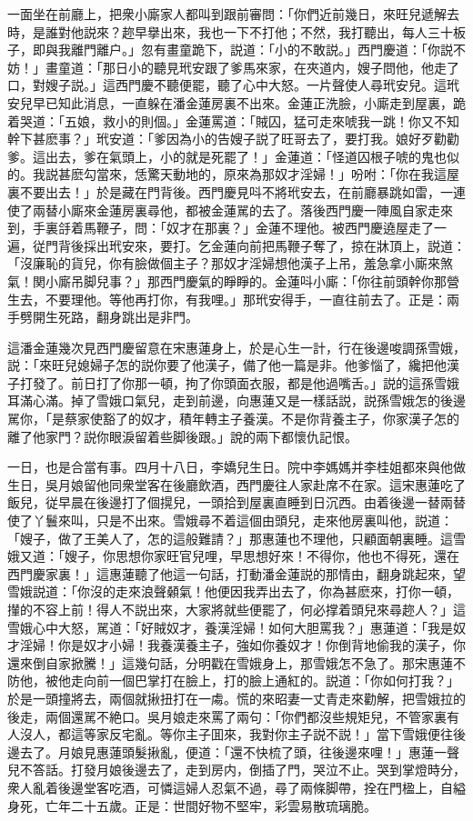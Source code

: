 一面坐在前廳上，把衆小廝家人都叫到跟前審問：「你們近前幾日，來旺兒遞解去時，是誰對他説來？趂早擧出來，我也一下不打他；不然，我打聽出，每人三十板子，即與我離門離户。」忽有畫童跪下，説道：「小的不敢説。」西門慶道：「你説不妨！」畫童道：「那日小的聽見玳安跟了爹馬來家，在夾道内，嫂子問他，他走了口，對嫂子説。」這西門慶不聽便罷，聽了心中大怒。一片聲使人尋玳安兒。這玳安兒早已知此消息，一直躲在潘金蓮房裏不出來。金蓮正洗臉，小廝走到屋裏，跪着哭道：「五娘，救小的則個。」金蓮罵道：「賊囚，猛可走來唬我一跳！你又不知幹下甚麽事？」玳安道：「爹因為小的告嫂子説了旺哥去了，要打我。娘好歹勸勸爹。這出去，爹在氣頭上，小的就是死罷了！」金蓮道：「怪道囚根子唬的鬼也似的。我説甚麽勾當來，恁驚天動地的，原來為那奴才淫婦！」吩咐：「你在我這屋裏不要出去！」於是藏在門背後。西門慶見呌不將玳安去，在前廳暴跳如雷，一連使了兩替小廝來金蓮房裏尋他，都被金蓮駡的去了。落後西門慶一陣風自家走來到，手裏㧱着馬鞭子，問：「奴才在那裏？」金蓮不理他。被西門慶遶屋走了一遍，従門背後採出玳安來，要打。乞金蓮向前把馬鞭子奪了，掠在牀頂上，説道：「沒廉恥的貨兒，你有臉做個主子？那奴才淫婦想他漢子上吊，羞急拿小廝來煞氣！関小廝吊脚兒事？」那西門慶氣的睜睜的。金蓮呌小廝：「你往前頭幹你那營生去，不要理他。等他再打你，有我哩。」那玳安得手，一直往前去了。正是：兩手劈開生死路，翻身跳出是非門。

這潘金蓮幾次見西門慶留意在宋惠蓮身上，於是心生一計，行在後邊唆調孫雪娥，説：「來旺兒媳婦子怎的説你要了他漢子，備了他一篇是非。他爹惱了，纔把他漢子打發了。前日打了你那一頓，拘了你頭面衣服，都是他過嘴舌。」説的這孫雪娥耳滿心滿。掉了雪娥口氣兒，走到前邊，向惠蓮又是一樣話説，説孫雪娥怎的後邊駡你，「是蔡家使豁了的奴才，積年轉主子養漢。不是你背養主子，你家漢子怎的離了他家門？説你眼淚留着些脚後跟。」說的兩下都懷仇記恨。

一日，也是合當有事。四月十八日，李嬌兒生日。院中李媽媽并李桂姐都來與他做生日，吳月娘留他同衆堂客在後廳飲酒，西門慶往人家赴席不在家。這宋惠蓮吃了飯兒，従早晨在後邊打了個㨪兒，一頭拾到屋裏直睡到日沉西。由着後邊一替兩替使了丫鬟來叫，只是不出來。雪娥尋不着這個由頭兒，走來他房裏叫他，説道：「嫂子，做了王美人了，怎的這般難請？」那惠蓮也不理他，只顧面朝裏睡。這雪娥又道：「嫂子，你思想你家旺官兒哩，早思想好來！不得你，他也不得死，還在西門慶家裏！」這惠蓮聽了他這一句話，打動潘金蓮説的那情由，翻身跳起來，望雪娥説道：「你沒的走來浪聲顙氣！他便因我弄出去了，你為甚麽來，打你一頓，攆的不容上前！得人不説出來，大家將就些便罷了，何必撑着頭兒來尋趂人？」這雪娥心中大怒，駡道：「好賊奴才，養漢淫婦！如何大胆罵我？」惠蓮道：「我是奴才淫婦！你是奴才小婦！我養漢養主子，強如你養奴才！你倒背地偷我的漢子，你還來倒自家掀騰！」這幾句話，分明戳在雪娥身上，那雪娥怎不急了。那宋惠蓮不防他，被他走向前一個巴掌打在臉上，打的臉上通紅的。説道：「你如何打我？」於是一頭撞將去，兩個就揪扭打在一䖏。慌的來昭妻一丈青走來勸解，把雪娥拉的後走，兩個還駡不絶口。吳月娘走來罵了兩句：「你們都沒些規矩兒，不管家裏有人沒人，都這等家反宅亂。等你主子囬來，我對你主子説不説！」當下雪娥便往後邊去了。月娘見惠蓮頭髮揪亂，便道：「還不快梳了頭，往後邊來哩！」惠蓮一聲兒不答話。打發月娘後邊去了，走到房内，倒插了門，哭泣不止。哭到掌燈時分，衆人亂着後邊堂客吃酒，可憐這婦人忍氣不過，尋了兩條脚帶，拴在門楹上，自縊身死，亡年二十五歲。正是：世間好物不堅牢，彩雲易散琉璃脆。

